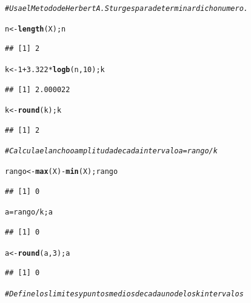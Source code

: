 \documentclass[12pt,letterpaper]{article}\usepackage[]{graphicx}\usepackage[]{color}
\makeatletter
\newcommand{\hlnum}[1]{\textcolor[rgb]{0.686,0.059,0.569}{#1}}%
\newcommand{\hlcom}[1]{\textcolor[rgb]{0.678,0.584,0.686}{\textit{#1}}}%
\newcommand{\hlopt}[1]{\textcolor[rgb]{0,0,0}{#1}}%
\newcommand{\hlstd}[1]{\textcolor[rgb]{0.345,0.345,0.345}{#1}}%
\newcommand{\hlkwb}[1]{\textcolor[rgb]{0.69,0.353,0.396}{#1}}%
\newcommand{\hlkwd}[1]{\textcolor[rgb]{0.737,0.353,0.396}{\textbf{#1}}}%
\newenvironment{kframe}{%
 \def\at@end@of@kframe{}%
 \ifinner\ifhmode%
  \def\at@end@of@kframe{\end{minipage}}%
  \begin{minipage}{\columnwidth}%
 \fi\fi%
 \def\FrameCommand##1{\hskip\@totalleftmargin \hskip-\fboxsep
 \colorbox{shadecolor}{##1}\hskip-\fboxsep
     \hskip-\linewidth \hskip-\@totalleftmargin \hskip\columnwidth}%
 \MakeFramed {\advance\hsize-\width
   \@totalleftmargin\z@ \linewidth\hsize
   \@setminipage}}%
 {\par\unskip\endMakeFramed%
 \at@end@of@kframe}
\newenvironment{knitrout}{}{} %
\makeatother
\begin{document}
\begin{enumerate}
\begin{knitrout}
\begin{kframe}
\begin{alltt}
\hlcom{# Usa el Metodo de Herbert A. Sturges para determinar dicho numero.}

\hlstd{n} \hlkwb{<-} \hlkwd{length}\hlstd{(X); n}
\end{alltt}
\begin{verbatim}
## [1] 2
\end{verbatim}
\begin{alltt}
\hlstd{k} \hlkwb{<-} \hlnum{1}\hlopt{+}\hlnum{3.322}\hlopt{*}\hlkwd{logb}\hlstd{(n,} \hlnum{10}\hlstd{); k}
\end{alltt}
\begin{verbatim}
## [1] 2.000022
\end{verbatim}
\begin{alltt}
\hlstd{k} \hlkwb{<-} \hlkwd{round}\hlstd{(k); k}
\end{alltt}
\begin{verbatim}
## [1] 2
\end{verbatim}
\end{kframe}
\end{knitrout}

\begin{knitrout}
\color{fgcolor}\begin{kframe}
\begin{alltt}
\hlcom{# Calcula el ancho o amplitud a de cada intervalo a=rango/k}

\hlstd{rango} \hlkwb{<-} \hlkwd{max}\hlstd{(X)}\hlopt{-}\hlkwd{min}\hlstd{(X); rango}
\end{alltt}
\begin{verbatim}
## [1] 0
\end{verbatim}
\begin{alltt}
\hlstd{a}\hlkwb{=}\hlstd{rango}\hlopt{/}\hlstd{k; a}
\end{alltt}
\begin{verbatim}
## [1] 0
\end{verbatim}
\begin{alltt}
\hlstd{a} \hlkwb{<-} \hlkwd{round}\hlstd{(a,} \hlnum{3}\hlstd{); a}
\end{alltt}
\begin{verbatim}
## [1] 0
\end{verbatim}
\end{kframe}
\end{knitrout}

\begin{knitrout}
\color{fgcolor}\begin{kframe}
\begin{alltt}
\hlcom{# Define los limites y puntos mediosde cada uno de los k intervalos}


\end{alltt}
\end{kframe}
\end{knitrout}
\end{enumerate}
\end{document}
